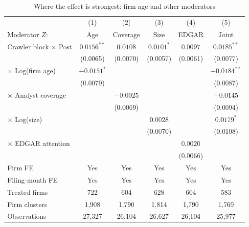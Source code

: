 \begin{table}[t]
\centering
\begin{threeparttable}
\caption{Where the effect is strongest: firm age and other moderators}
\label{tab:locus}
\footnotesize
\setlength{\tabcolsep}{4pt}
\begin{tabular}{lccccc}
\toprule
 & (1) & (2) & (3) & (4) & (5) \\
Moderator $Z$: & Age & Coverage & Size & EDGAR & Joint \\
\midrule
Crawler block $\times$ Post        & $0.0156^{**}$ & $0.0108$ & $0.0101^{*}$ & $0.0097$ & $0.0185^{**}$ \\
                                   & (0.0065)      & (0.0070) & (0.0057)     & (0.0061) & (0.0077) \\
\quad $\times$ Log(firm age)       & $-0.0151^{*}$ &          &              &          & $-0.0184^{**}$ \\
                                   & (0.0079)      &          &              &          & (0.0087) \\
\quad $\times$ Analyst coverage    &               & $-0.0025$ &             &          & $-0.0145$ \\
                                   &               & (0.0069)  &             &          & (0.0094) \\
\quad $\times$ Log(size)           &               &           & $0.0028$    &          & $0.0179^{*}$ \\
                                   &               &           & (0.0070)    &          & (0.0108) \\
\quad $\times$ EDGAR attention     &               &           &             & $0.0020$ & \\
                                   &               &           &             & (0.0066) & \\
\midrule
Firm FE          & Yes & Yes & Yes & Yes & Yes \\
Filing-month FE  & Yes & Yes & Yes & Yes & Yes \\
Treated firms    & 722 & 604 & 628 & 604 & 583 \\
Firm clusters    & 1{,}908 & 1{,}790 & 1{,}814 & 1{,}790 & 1{,}769 \\
Observations     & 27{,}327 & 26{,}104 & 26{,}627 & 26{,}104 & 25{,}977 \\
\bottomrule
\end{tabular}
\begin{tablenotes}\footnotesize

\end{tablenotes}
\end{threeparttable}
\end{table}
